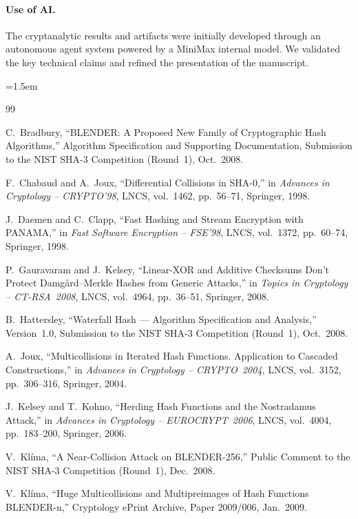 \documentclass[11pt,a4paper]{article}
\theoremstyle{definition}
\theoremstyle{remark}
\begin{document}
\paragraph{Use of AI.}
The cryptanalytic results and artifacts were initially developed through an autonomous agent system powered by a MiniMax internal model. We validated the key technical claims and refined the presentation of the manuscript.

{\emergencystretch=1.5em
\begin{thebibliography}{99}

C.~Bradbury,
``BLENDER: A Proposed New Family of Cryptographic Hash Algorithms,'' Algorithm Specification and Supporting Documentation, Submission to the NIST SHA-3 Competition (Round~1), Oct.~2008.

F.~Chabaud and A.~Joux,
``Differential Collisions in SHA-0,'' in \emph{Advances in Cryptology -- CRYPTO'98}, LNCS, vol.~1462, pp.~56--71, Springer, 1998.

J.~Daemen and C.~Clapp,
``Fast Hashing and Stream Encryption with PANAMA,'' in \emph{Fast Software Encryption -- FSE'98}, LNCS, vol.~1372, pp.~60--74, Springer, 1998.

P.~Gauravaram and J.~Kelsey,
``Linear-XOR and Additive Checksums Don't Protect Damg\aa rd--Merkle Hashes from Generic Attacks,'' in \emph{Topics in Cryptology -- CT-RSA~2008}, LNCS, vol.~4964, pp.~36--51, Springer, 2008.

B.~Hattersley,
``Waterfall Hash --- Algorithm Specification and Analysis,'' Version~1.0, Submission to the NIST SHA-3 Competition (Round~1), Oct.~2008.

A.~Joux,
``Multicollisions in Iterated Hash Functions. Application to Cascaded Construc\-tions,'' in \emph{Advances in Cryptology -- CRYPTO~2004}, LNCS, vol.~3152, pp.~306--316, Springer, 2004.

J.~Kelsey and T.~Kohno,
``Herding Hash Functions and the Nostradamus Attack,'' in \emph{Advances in Cryptology -- EUROCRYPT~2006}, LNCS, vol.~4004, pp.~183--200, Springer, 2006.

V.~Kl\'{i}ma,
``A Near-Collision Attack on BLENDER-256,'' Public Comment to the NIST SHA-3 Competition (Round~1), Dec.~2008.

V.~Kl\'{i}ma,
``Huge Multicollisions and Multipreimages of Hash Functions BLENDER-n,'' Cryptology ePrint Archive, Paper 2009/006, Jan.~2009.


\end{thebibliography}}
\end{document}
